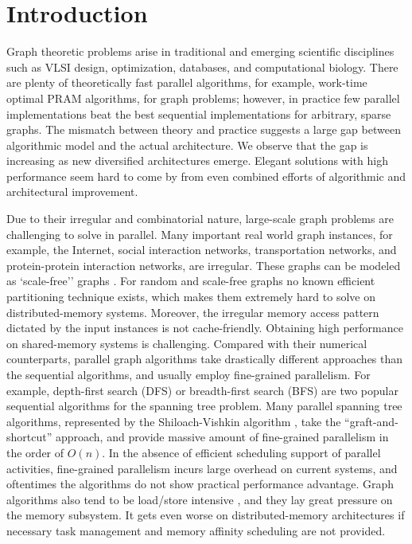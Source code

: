 
\section{Introduction}
\label{s:intr}

 Graph theoretic problems arise in traditional and emerging scientific disciplines such as VLSI design, optimization, databases, and computational biology. There are plenty of theoretically fast parallel algorithms, for example, work-time optimal PRAM algorithms, for graph problems; however, in
 practice few parallel implementations beat the best sequential implementations for arbitrary, sparse
 graphs. The mismatch between theory and practice suggests a large gap between algorithmic model and the actual architecture. We observe that the gap is increasing as new diversified architectures emerge. Elegant solutions with high performance seem hard to come by from even combined efforts of algorithmic and architectural improvement. 

Due to their irregular and combinatorial nature, large-scale graph problems are challenging to solve in parallel. Many important real world graph instances, for example, the Internet, social interaction networks, transportation networks, and protein-protein interaction networks, are irregular. These graphs can be modeled as `scale-free'' graphs \cite{CZF04}. For random and scale-free graphs no known efficient partitioning technique exists, which makes them extremely hard to solve on distributed-memory systems. Moreover, the irregular memory access pattern dictated by the input instances is not cache-friendly. Obtaining high performance on shared-memory systems is challenging. Compared with their numerical counterparts, parallel graph algorithms take drastically different approaches than the sequential algorithms, and usually employ fine-grained parallelism. For example, depth-first search (DFS) or breadth-first search (BFS) are two popular sequential algorithms for the spanning tree problem. Many parallel spanning tree algorithms,  represented by the Shiloach-Vishkin algorithm \cite{SV82}, take the ``graft-and-shortcut'' approach, and provide massive amount of fine-grained parallelism in the order of $O(n)$. In the absence of efficient scheduling support of parallel activities, fine-grained parallelism incurs large overhead on current systems, and oftentimes the algorithms do not show practical performance advantage. Graph algorithms also tend to be load/store intensive \cite{G06}, and they lay great pressure on the memory subsystem. It gets even worse on distributed-memory architectures if necessary task management and memory affinity scheduling are not provided.  
 
